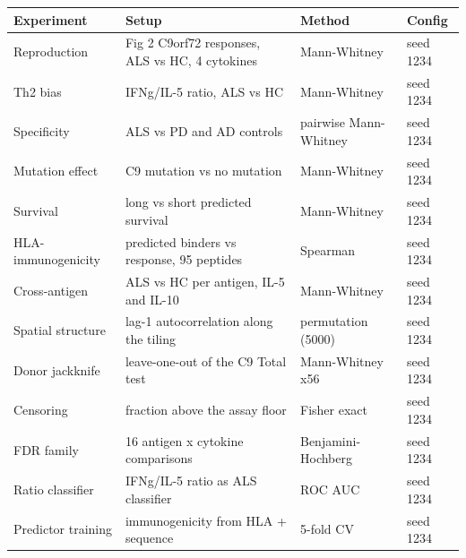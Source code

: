 \begin{tabular}{p{3.0cm}p{6.2cm}p{3.1cm}l}
\toprule
Experiment & Setup & Method & Config \\
\midrule
Reproduction & Fig 2 C9orf72 responses, ALS vs HC, 4 cytokines & Mann-Whitney & seed 1234 \\
Th2 bias & IFNg/IL-5 ratio, ALS vs HC & Mann-Whitney & seed 1234 \\
Specificity & ALS vs PD and AD controls & pairwise Mann-Whitney & seed 1234 \\
Mutation effect & C9 mutation vs no mutation & Mann-Whitney & seed 1234 \\
Survival & long vs short predicted survival & Mann-Whitney & seed 1234 \\
HLA-immunogenicity & predicted binders vs response, 95 peptides & Spearman & seed 1234 \\
Cross-antigen & ALS vs HC per antigen, IL-5 and IL-10 & Mann-Whitney & seed 1234 \\
Spatial structure & lag-1 autocorrelation along the tiling & permutation (5000) & seed 1234 \\
Donor jackknife & leave-one-out of the C9 Total test & Mann-Whitney x56 & seed 1234 \\
Censoring & fraction above the assay floor & Fisher exact & seed 1234 \\
FDR family & 16 antigen x cytokine comparisons & Benjamini-Hochberg & seed 1234 \\
Ratio classifier & IFNg/IL-5 ratio as ALS classifier & ROC AUC & seed 1234 \\
Predictor training & immunogenicity from HLA + sequence & 5-fold CV & seed 1234 \\
\bottomrule
\end{tabular}
